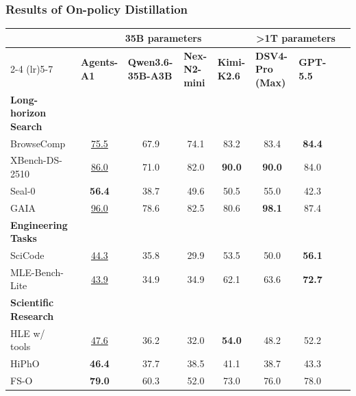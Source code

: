 \documentclass{llmxive}
\providecommand{\ProjectName}{Agents-A1}
\begin{document}
\subsubsection{Results of On-policy Distillation} 

\begin{table}[]
    \centering
    \footnotesize
    \setlength{\tabcolsep}{1.9pt}
    \begin{tabular}{@{}lcccccccc@{}}
    \toprule
    & \multicolumn{4}{c}{\textbf{35B parameters}} & \multicolumn{3}{c}{\textbf{\textgreater{}1T parameters}} \\
    \cmidrule(lr){2-4} \cmidrule(lr){5-7}
    & \multicolumn{1}{l}{\textbf{\ProjectName}} & \multicolumn{1}{l}{\textbf{Qwen3.6-35B-A3B}} & \multicolumn{1}{l}{\textbf{Nex-N2-mini}} & \multicolumn{1}{l}{\textbf{Kimi-K2.6}} & \multicolumn{1}{l}{\textbf{DSV4-Pro (Max)}} & \multicolumn{1}{l}{\textbf{GPT-5.5}} \\
    \midrule
    \textbf{Long-horizon Search} & \multicolumn{1}{l}{} & \multicolumn{1}{l}{} & \multicolumn{1}{l}{} & \multicolumn{1}{l}{} & \multicolumn{1}{l}{} & \multicolumn{1}{l}{} & \multicolumn{1}{l}{} & \multicolumn{1}{l}{} \\
    \midrule
    BrowseComp~\citep{browsecomp} & \underline{75.5} & 67.9 & 74.1 & 83.2 & 83.4 & \textbf{84.4} \\
    XBench-DS-2510~\citep{xbench} & \underline{86.0} & 71.0 & 82.0 & \textbf{90.0} & \textbf{90.0} & 84.0 \\
    Seal-0~\citep{sealqa} & \textbf{56.4} & 38.7 & 49.6 & 50.5 & 55.0 & 42.3 \\
    GAIA~\citep{gaia} & \underline{96.0} & 78.6 & 82.5 & 80.6 & \textbf{98.1} & 87.4 \\
    \midrule
    \textbf{Engineering Tasks} & & & & & & \\
    \midrule
    SciCode~\citep{scicode} & \underline{44.3} & 35.8 & 29.9 & 53.5 & 50.0 & \textbf{56.1} \\
    MLE-Bench-Lite~\citep{mlebench} & \underline{43.9} & 34.9 & 34.9 & 62.1 & 63.6 & \textbf{72.7} \\
    \midrule
    \textbf{Scientific Research} & & & & & & \\
    \midrule
    HLE w/ tools~\citep{phan2025humanity} & \underline{47.6} & 36.2 & 32.0 & \textbf{54.0} & 48.2 & 52.2 \\
    HiPhO~\citep{hipho} & \textbf{46.4} & 37.7 & 38.5 & 41.1 & 38.7 & 43.3 \\
    FS-O~\citep{frontierscience} & \textbf{79.0} & 60.3 & 52.0 & 73.0 & 76.0 & 78.0 \\

\end{tabular}
\end{table}
\end{document}
